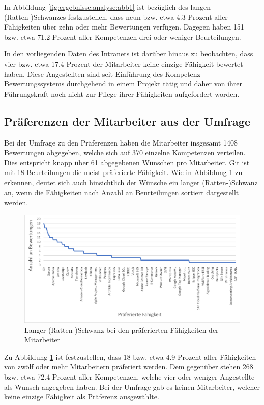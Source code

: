 In Abbildung \ref{fig:ergebnisse:analyse:abb1} ist bezüglich des langen (Ratten-)Schwanzes festzustellen, dass neun bzw. etwa 4.3 Prozent aller Fähigkeiten über zehn oder mehr Bewertungen verfügen. Dagegen haben 151 bzw. etwa 71.2 Prozent aller Kompetenzen drei oder weniger Beurteilungen.

In den vorliegenden Daten des Intranets ist darüber hinaus zu beobachten, dass vier bzw. etwa 17.4 Prozent der Mitarbeiter keine einzige Fähigkeit bewertet haben. Diese Angestellten sind seit Einführung des Kompetenz-Bewertungssystems durchgehend in einem Projekt tätig und daher von ihrer Führungskraft noch nicht zur Pflege ihrer Fähigkeiten aufgefordert worden.

\subsection{Präferenzen der Mitarbeiter aus der Umfrage}
\label{ch:ergebnisse:analyse:praeferenzen}
Bei der Umfrage zu den Präferenzen haben die Mitarbeiter insgesamt 1408 Bewertungen abgegeben, welche sich auf 370 einzelne Kompetenzen verteilen. Dies entspricht knapp über 61 abgegebenen Wünschen pro Mitarbeiter. Git ist mit 18 Beurteilungen die meist präferierte Fähigkeit. Wie in Abbildung \ref{fig:ergebnisse:analyse:abb2} zu erkennen, deutet sich auch hinsichtlich der Wünsche ein langer (Ratten-)Schwanz an, wenn die Fähigkeiten nach Anzahl an Beurteilungen sortiert dargestellt werden.
 
\begin{figure}[h]
	\centering
	\includegraphics[width=1\textwidth]{gfx/long-tail-praeferenzen.png}
	\caption{Langer (Ratten-)Schwanz bei den präferierten Fähigkeiten der Mitarbeiter}
	\label{fig:ergebnisse:analyse:abb2}
\end{figure}

Zu Abbildung \ref{fig:ergebnisse:analyse:abb2} ist festzustellen, dass 18 bzw. etwa 4.9 Prozent aller Fähigkeiten von zwölf oder mehr Mitarbeitern präferiert werden. Dem gegenüber stehen 268 bzw. etwa 72.4 Prozent aller Kompetenzen, welche vier oder weniger Angestellte als Wunsch angegeben haben. Bei der Umfrage gab es keinen Mitarbeiter, welcher keine einzige Fähigkeit als Präferenz ausgewählte.

